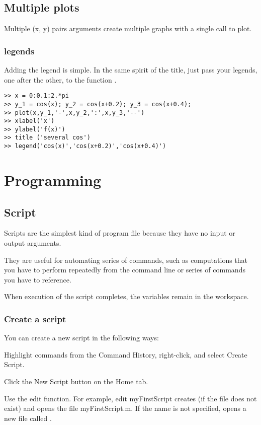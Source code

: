 \section{Multiple plots}

Multiple (x, y) pairs arguments create multiple graphs with a single call to plot.
\subsection{legends}

Adding the legend is simple.
In the same spirit of the title, just pass your legends, one after the other, to the function .

\begin{lstlisting}
>> x = 0:0.1:2.*pi
>> y_1 = cos(x); y_2 = cos(x+0.2); y_3 = cos(x+0.4);
>> plot(x,y_1,'-',x,y_2,':',x,y_3,'--')
>> xlabel('x')
>> ylabel('f(x)')
>> title ('several cos')
>> legend('cos(x)','cos(x+0.2)','cos(x+0.4)')
\end{lstlisting}




\chapter{Programming}


\section{Script}

Scripts are the simplest kind of program file because they have no input or output arguments. 

They are useful for automating series of \matlab commands, such as computations that you have to perform repeatedly from the command line or series of commands you have to reference.

When execution of the script completes, the variables remain in the \matlab workspace. 


\subsection{Create a script}
You can create a new script in the following ways:

Highlight commands from the Command History, right-click, and select Create Script.

Click the New Script  button on the Home tab.

Use the edit function. For example, edit myFirstScript creates (if the file does not exist) and opens the file myFirstScript.m. If the name is not specified, \matlab opens a new file called .

